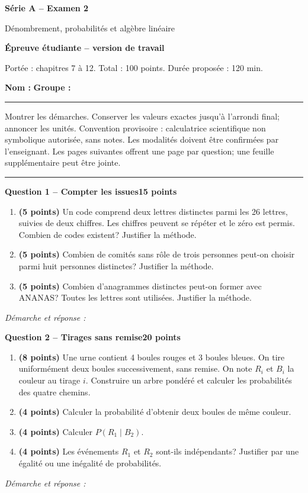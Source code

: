 \documentclass[11pt,a4paper]{article}
\begin{document}
{\LARGE\bfseries Série A -- Examen 2}\par
{\large Dénombrement, probabilités et algèbre linéaire}\par
\textbf{Épreuve étudiante -- version de travail}\par
Portée : chapitres 7 à 12. Total : 100 points. Durée proposée : 120 min.\par
\textbf{Nom :} \hrulefill\quad \textbf{Groupe :} \rule{22mm}{0.3pt}\par
\small Montrer les démarches. Conserver les valeurs exactes jusqu’à l’arrondi final; annoncer les unités. Convention provisoire : calculatrice scientifique non symbolique autorisée, sans notes. Les modalités doivent être confirmées par l’enseignant. Les pages suivantes offrent une page par question; une feuille supplémentaire peut être jointe.\normalsize\par
\vspace{3mm}\hrule\vspace{4mm}
{\large\bfseries Question 1 -- Compter les issues}\hfill\textbf{15 points}\par
\begin{enumerate}
\item \textbf{(5 points)} Un code comprend deux lettres distinctes parmi les 26 lettres, suivies de deux chiffres. Les chiffres peuvent se répéter et le zéro est permis. Combien de codes existent? Justifier la méthode.
\item \textbf{(5 points)} Combien de comités sans rôle de trois personnes peut-on choisir parmi huit personnes distinctes? Justifier la méthode.
\item \textbf{(5 points)} Combien d’anagrammes distinctes peut-on former avec ANANAS? Toutes les lettres sont utilisées. Justifier la méthode.
\end{enumerate}
\vspace{3mm}\textit{Démarche et réponse :}\par\vfill

\newpage
{\large\bfseries Question 2 -- Tirages sans remise}\hfill\textbf{20 points}\par
\begin{enumerate}
\item \textbf{(8 points)} Une urne contient 4 boules rouges et 3 boules bleues. On tire uniformément deux boules successivement, sans remise. On note \(R_i\) et \(B_i\) la couleur au tirage \(i\). Construire un arbre pondéré et calculer les probabilités des quatre chemins.
\item \textbf{(4 points)} Calculer la probabilité d’obtenir deux boules de même couleur.
\item \textbf{(4 points)} Calculer \(P(R_1\mid B_2)\).
\item \textbf{(4 points)} Les événements \(R_1\) et \(R_2\) sont-ils indépendants? Justifier par une égalité ou une inégalité de probabilités.
\end{enumerate}
\vspace{3mm}\textit{Démarche et réponse :}\par\vfill
\end{document}
